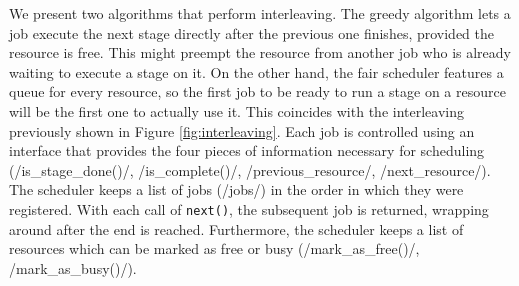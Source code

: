 We present two algorithms that perform interleaving. The greedy algorithm lets a job execute the next stage directly after the previous one finishes, provided the resource is free. This might preempt the resource from another job who is already waiting to execute a stage on it. On the other hand, the fair scheduler features a queue for every resource, so the first job to be ready to run a stage on a resource will be the first one to actually use it. This coincides with the interleaving previously shown in Figure \ref{fig:interleaving}. Each job is controlled using an interface that provides the four pieces of information necessary for scheduling (\pythoninline/is_stage_done()/, \pythoninline/is_complete()/, \pythoninline/previous_resource/, \pythoninline/next_resource/). The scheduler keeps a list of jobs (\pythoninline/jobs/) in the order in which they were registered. With each call of \texttt{next()}, the subsequent job is returned, wrapping around after the end is reached. Furthermore, the scheduler keeps a list of resources which can be marked as free or busy (\pythoninline/mark_as_free()/, \pythoninline/mark_as_busy()/).
